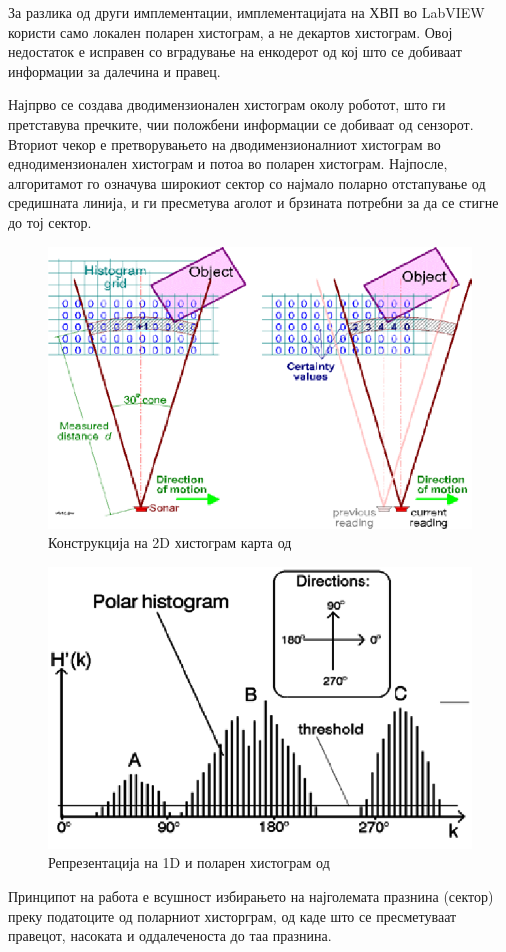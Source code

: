 \documentclass[11pt]{article}
\begin{document}
  За разлика од други имплементации, имплементацијата на ХВП во LabVIEW користи само локален поларен хистограм, а не декартов хистограм. Овој недостаток е исправен со вградување на енкодерот од кој што се добиваат информации за далечина и правец.

  Најпрво се создава дводимензионален хистограм околу роботот, што ги претставува пречките, чии положбени информации се добиваат од сензорот. Вториот чекор е претворувањето на дводимензионалниот хистограм во еднодимензионален хистограм и потоа во поларен хистограм. Најпосле, алгоритамот го означува широкиот сектор со најмало поларно отстапување од средишната линија, и ги пресметува аголот и брзината потребни за да се стигне до тој сектор.

  \begin{figure}[H]
    \centering
    \includegraphics[width=0.5\linewidth]{./images/2d_his.png}
    \caption{Конструкција на 2D хистограм карта од \cite{vfh_images}}
    \label{fig:2d_his.png}
    \end{figure}

  \begin{figure}[H]
    \centering
    \includegraphics[width=0.5\linewidth]{./images/1d_his.png}
    \caption{Репрезентација на 1D и поларен хистограм од \cite{vfh_images}}
    \label{fig:1d_his.png}
    \end{figure}

  Принципот на работа е всушност избирањето на најголемата празнина (сектор) преку податоците од поларниот хисторграм, од каде што се пресметуваат правецот, насоката и оддалеченоста до таа празнина.
\end{document}
